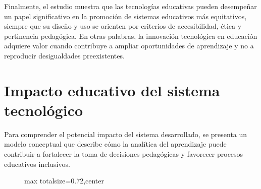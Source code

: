 \begin{refsection}
Finalmente, el estudio muestra que las tecnologías educativas pueden desempeñar un papel significativo en la promoción de sistemas educativos más equitativos, siempre que su diseño y uso se orienten por criterios de accesibilidad, ética y pertinencia pedagógica. En otras palabras, la innovación tecnológica en educación adquiere valor cuando contribuye a ampliar oportunidades de aprendizaje y no a reproducir desigualdades preexistentes.

\section{Impacto educativo del sistema tecnológico}

Para comprender el potencial impacto del sistema desarrollado, se presenta un modelo conceptual que describe cómo la analítica del aprendizaje puede contribuir a fortalecer la toma de decisiones pedagógicas y favorecer procesos educativos inclusivos.

\begin{figure}[htbp]
\centering
\begin{adjustbox}{max totalsize={\textwidth}{0.72\textheight},center}
\end{adjustbox}
\end{figure}
\end{refsection}
